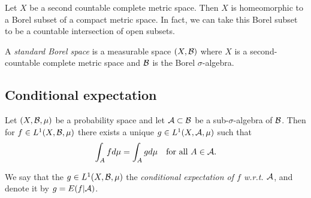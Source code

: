 \documentclass[twoside, a4paper, 10pt]{amsart}
\begin{document}
\begin{corol}\label{corol: embedding Polish into compact} Let $X$ be a second countable complete metric space. Then $X$ is homeomorphic to a Borel subset of a compact metric space. In fact, we can take this Borel subset to be a countable intersection of open subsets.

\end{corol}

\begin{mydef} A \textit{standard Borel space} is a measurable space $(X,\mathcal{B})$ where $X$ is a second-countable complete metric space and $\mathcal{B}$ is the Borel $\sigma$-algebra.

\end{mydef}

\subsection{Conditional expectation}

\begin{thm} Let $(X, \mathcal{B}, \mu)$ be a probability space and let $\mathcal{A} \subset \mathcal{B}$ be a sub-$\sigma$-algebra of $\mathcal{B}$. Then for $f \in L^1(X,\mathcal{B},\mu)$ there exists a unique $g \in L^1(X,\mathcal{A},\mu)$ such that $$\int_A f d\mu = \int_A g d\mu \quad\text{for all } A\in \mathcal{A}.$$

\end{thm}

\begin{mydef} We say that the $g \in L^1(X,\mathcal{B},\mu)$ the \textit{conditional expectation of $f$ w.r.t. $\mathcal{A}$}, and denote it by $g = E(f|\mathcal{A})$.

\end{mydef}
\end{document}
